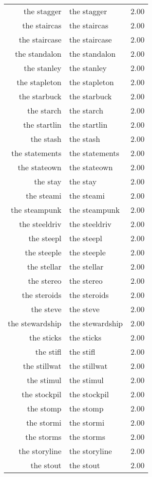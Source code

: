 \begin{table}[ht]
\begin{tabular}{rlr}
  the stagger & the stagger & 2.00 \\ 
  the staircas & the staircas & 2.00 \\ 
  the staircase & the staircase & 2.00 \\ 
  the standalon & the standalon & 2.00 \\ 
  the stanley & the stanley & 2.00 \\ 
  the stapleton & the stapleton & 2.00 \\ 
  the starbuck & the starbuck & 2.00 \\ 
  the starch & the starch & 2.00 \\ 
  the startlin & the startlin & 2.00 \\ 
  the stash & the stash & 2.00 \\ 
  the statements & the statements & 2.00 \\ 
  the stateown & the stateown & 2.00 \\ 
  the stay & the stay & 2.00 \\ 
  the steami & the steami & 2.00 \\ 
  the steampunk & the steampunk & 2.00 \\ 
  the steeldriv & the steeldriv & 2.00 \\ 
  the steepl & the steepl & 2.00 \\ 
  the steeple & the steeple & 2.00 \\ 
  the stellar & the stellar & 2.00 \\ 
  the stereo & the stereo & 2.00 \\ 
  the steroids & the steroids & 2.00 \\ 
  the steve & the steve & 2.00 \\ 
  the stewardship & the stewardship & 2.00 \\ 
  the sticks & the sticks & 2.00 \\ 
  the stifl & the stifl & 2.00 \\ 
  the stillwat & the stillwat & 2.00 \\ 
  the stimul & the stimul & 2.00 \\ 
  the stockpil & the stockpil & 2.00 \\ 
  the stomp & the stomp & 2.00 \\ 
  the stormi & the stormi & 2.00 \\ 
  the storms & the storms & 2.00 \\ 
  the storyline & the storyline & 2.00 \\ 
  the stout & the stout & 2.00 \\ 

\end{tabular}
\end{table}
